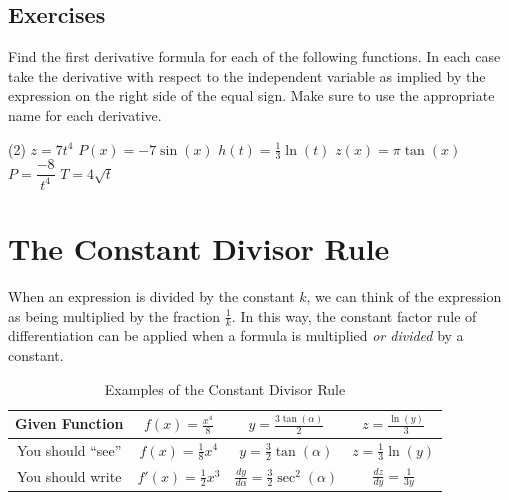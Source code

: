 \documentclass[10pt,oneside,]{book}
\theoremstyle{plain}
\theoremstyle{definition}
\numberwithin{equation}{section}
\newcommand{\fe}[2]{#1\mathopen{}\left(#2\right)\mathclose{}}
\newcommand{\fd}[1]{#1'}
\newcommand{\lz}[2]{\frac{d#1}{d#2}}
\begin{document}
\subsection[Exercises]{Exercises}\label{exercises-34}
\hypertarget{exercisegroup-73}{\null}Find the first derivative formula for each of the following functions.  In each case take the derivative with respect to the independent variable as implied by the expression on the right side of the equal sign.  Make sure to use the appropriate name for each derivative.%
\par
\begin{exercisegroup}(2)
\exercise[1.]\hypertarget{exercise-357}{\null}\(z=7t^4\)%
\exercise[2.]\hypertarget{exercise-358}{\null}\(\fe{P}{x}=-7\fe{\sin}{x}\)%
\exercise[3.]\hypertarget{exercise-359}{\null}\(\fe{h}{t}=\frac{1}{3}\fe{\ln}{t}\)%
\exercise[4.]\hypertarget{exercise-360}{\null}\(\fe{z}{x}=\pi\fe{\tan}{x}\)%
\exercise[5.]\hypertarget{exercise-361}{\null}\(P=\dfrac{-8}{t^4}\)%
\exercise[6.]\hypertarget{exercise-362}{\null}\(T=4\sqrt{t}\)%
\end{exercisegroup}
\par\smallskip\noindent
\typeout{************************************************}
\typeout{************************************************}
\section[The Constant Divisor Rule]{The Constant Divisor Rule}\label{section-constant-divisor-rule}
When an expression is divided by the constant \(k\), we can think of the expression as being multiplied by the fraction \(\frac{1}{k}\).  In this way, the constant factor rule of differentiation can be applied when a formula is multiplied \emph{or divided} by a constant.%
\begin{table}
\centering
\caption{Examples of the Constant Divisor Rule\label{table-constant-divisor-rule}}
\begin{tabular}{c|c|c|c}
\toprule
Given Function&\(\fe{f}{x}=\frac{x^4}{8}\)&\(y=\frac{3\fe{\tan}{\alpha}}{2}\)&\(z=\frac{\fe{\ln}{y}}{3}\)\\
\midrule
You should ``see''&\(\fe{f}{x}=\frac{1}{8}x^4\)&\(y=\frac{3}{2}\fe{\tan}{\alpha}\)&\(z=\frac{1}{3}\fe{\ln}{y}\)\\
\midrule
You should write&\(\fe{\fd{f}}{x}=\frac{1}{2}x^3\)&\(\lz{y}{\alpha}=\frac{3}{2}\fe{\sec^2}{\alpha}\)&\(\lz{z}{y}=\frac{1}{3y}\)\\
\bottomrule
\end{tabular}
\end{table}
\typeout{************************************************}
\typeout{************************************************}
\end{document}

